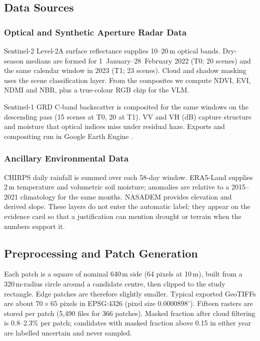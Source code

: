 \documentclass[11pt]{article}
\begin{document}
\subsection{Data Sources}

\subsubsection{Optical and Synthetic Aperture Radar Data}

Sentinel-2 Level-2A surface reflectance \citep{drusch2012} supplies
10--20\,m optical bands. Dry-season medians are formed for
1~January--28~February 2022 (T0; 20 scenes) and the same calendar
window in 2023 (T1; 23 scenes). Cloud and shadow masking uses the
scene classification layer. From the composites we compute NDVI, EVI,
NDMI and NBR, plus a true-colour RGB chip for the VLM.

Sentinel-1 GRD C-band backscatter \citep{torres2012} is composited for
the same windows on the descending pass (15 scenes at T0, 20 at T1).
VV and VH (dB) capture structure and moisture that optical indices
miss under residual haze. Exports and compositing run in Google Earth
Engine \citep{gorelick2017}.

\subsubsection{Ancillary Environmental Data}

CHIRPS daily rainfall \citep{funk2015} is summed over each 58-day
window. ERA5-Land \citep{munozsabater2021} supplies 2\,m temperature
and volumetric soil moisture; anomalies are relative to a 2015--2021
climatology for the same months. NASADEM \citep{nasadem2020} provides
elevation and derived slope. These layers do not enter the automatic
label; they appear on the evidence card so that a justification can
mention drought or terrain when the numbers support it.

\subsection{Preprocessing and Patch Generation}

Each patch is a square of nominal 640\,m side (64 pixels at 10\,m),
built from a 320\,m-radius circle around a candidate centre, then
clipped to the study rectangle. Edge patches are therefore slightly
smaller. Typical exported GeoTIFFs are about $70\times 65$ pixels in
EPSG:4326 (pixel size $0.0000898^\circ$). Fifteen rasters are stored
per patch (5,490 files for 366 patches). Masked fraction after cloud
filtering is 0.8--2.3\% per patch; candidates with masked fraction
above 0.15 in either year are labelled uncertain and never sampled.
\end{document}
